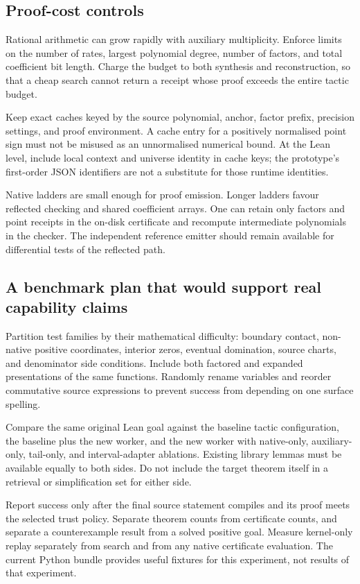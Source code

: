 \subsection{Proof-cost controls}

Rational arithmetic can grow rapidly with auxiliary multiplicity. Enforce
limits on the number of rates, largest polynomial degree, number of factors,
and total coefficient bit length. Charge the budget to both synthesis and
reconstruction, so that a cheap search cannot return a receipt whose proof
exceeds the entire tactic budget.

Keep exact caches keyed by the source polynomial, anchor, factor prefix,
precision settings, and proof environment. A cache entry for a positively
normalised point sign must not be misused as an unnormalised numerical bound.
At the Lean level, include local context and universe identity in cache keys;
the prototype's first-order JSON identifiers are not a substitute for those
runtime identities.

Native ladders are small enough for proof emission. Longer ladders favour
reflected checking and shared coefficient arrays. One can retain only factors
and point receipts in the on-disk certificate and recompute intermediate
polynomials in the checker. The independent reference emitter should remain
available for differential tests of the reflected path.

\subsection{A benchmark plan that would support real capability claims}

Partition test families by their mathematical difficulty: boundary contact,
non-native positive coordinates, interior zeros, eventual domination, source
charts, and denominator side conditions. Include both factored and expanded
presentations of the same functions. Randomly rename variables and reorder
commutative source expressions to prevent success from depending on one
surface spelling.

Compare the same original Lean goal against the baseline tactic configuration,
the baseline plus the new worker, and the new worker with native-only,
auxiliary-only, tail-only, and interval-adapter ablations. Existing library
lemmas must be available equally to both sides. Do not include the target
theorem itself in a retrieval or simplification set for either side.

Report success only after the final source statement compiles and its proof
meets the selected trust policy. Separate theorem counts from certificate
counts, and separate a counterexample result from a solved positive goal.
Measure kernel-only replay separately from search and from any native
certificate evaluation. The current Python bundle provides useful fixtures
for this experiment, not results of that experiment.

